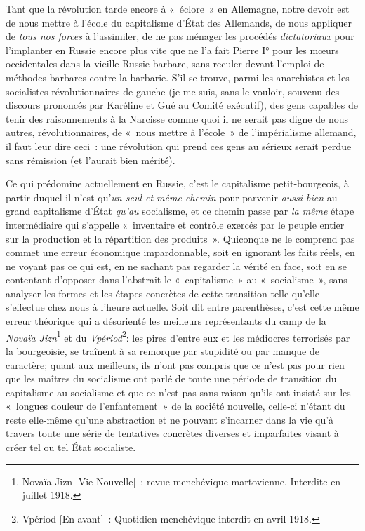 \documentclass[french,twoside]{book} %
\begin{document}
Tant que la révolution tarde encore à « éclore » en Allemagne, notre devoir est de nous mettre à l’école du capitalisme d’État des Allemands, de nous appliquer de \emph{tous nos forces} à l’assimiler, de ne pas ménager les procédés \emph{dictatoriaux} pour l’implanter en Russie encore plus vite que ne l’a fait Pierre I° pour les mœurs occidentales dans la vieille Russie barbare, sans reculer devant l’emploi de méthodes barbares contre la barbarie. S'il se trouve, parmi les anarchistes et les socialistes‑révolutionnaires de gauche (je me suis, sans le vouloir, souvenu des discours prononcés par Karéline et Gué au Comité exécutif), des gens capables de tenir des raisonnements à la Narcisse comme quoi il ne serait pas digne de nous autres, révolutionnaires, de « nous mettre à l’école » de l’impérialisme allemand, il faut leur dire ceci : une révolution qui prend ces gens au sérieux serait perdue sans rémission (et l’aurait bien mérité).\par
Ce qui prédomine actuellement en Russie, c’est le capitalisme petit‑bourgeois, à partir duquel il n’est qu’\emph{un seul et même chemin} pour parvenir \emph{aussi bien} au grand capitalisme d’État \emph{qu’au} socialisme, et ce chemin passe par \emph{la même} étape intermédiaire qui s’appelle « inventaire et contrôle exercés par le peuple entier sur la production et la répartition des produits ». Quiconque ne le comprend pas commet une erreur économique impardonnable, soit en ignorant les faits réels, en ne voyant pas ce qui est, en ne sachant pas regarder la vérité en face, soit en se contentant d’opposer dans l’abstrait le \hspace{1em}« capitalisme » au « socialisme », sans analyser les formes et les étapes concrètes de cette transition telle qu’elle s’effectue chez nous à l’heure actuelle. Soit dit entre parenthèses, c’est cette même erreur théorique qui a désorienté les meilleurs représentants du camp de la \emph{Novaïa Jizn}\footnote{Novaïa Jizn [Vie Nouvelle] : revue menchévique martovienne. Interdite en juillet 1918.} et du \emph{Vpériod}\footnote{Vpériod [En avant] : Quotidien menchévique interdit en avril 1918.}: les pires d’entre eux et les médiocres terrorisés par la bourgeoisie, se traînent à sa remorque par stupidité ou par manque de caractère; quant aux meilleurs, ils n’ont pas compris que ce n’est pas pour rien que les maîtres du socialisme ont parlé de toute une période de transition du capitalisme au socialisme et que ce n’est pas sans raison qu’ils ont insisté sur les « longues douleur de l’enfantement » de la société nouvelle, celle‑ci n’étant du reste elle-même qu’une abstraction et ne pouvant s’incarner dans la vie qu’à travers toute une série de tentatives concrètes diverses et imparfaites visant à créer tel ou tel État socialiste.\par
\end{document}

